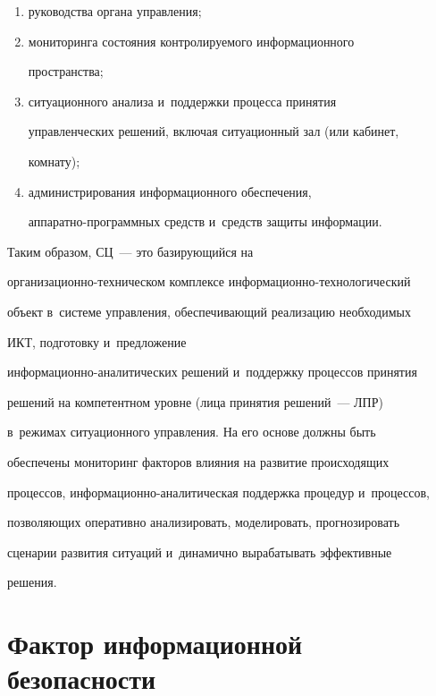     \begin{enumerate}[(1)]

    \item руководства органа управления;

    \item мониторинга состояния контролируемого информационного 

пространства;

    \item ситуационного анализа и~поддержки процесса принятия 

управленческих решений, включая ситуационный зал (или кабинет, 

комнату);

    \item администрирования информационного обеспечения,  

ап\-па\-рат\-но-про\-грам\-мных средств и~средств защиты информации. 

    \end{enumerate}

    

    Таким образом, СЦ~--- это базирующийся на  

организационно-техническом комплексе ин\-фор\-ма\-ци\-он\-но-тех\-но\-ло\-ги\-че\-ский 

объект в~сис\-те\-ме управ\-ле\-ния, обеспечивающий реализацию необходимых 

ИКТ, подготовку и~предложение 

ин\-фор\-ма\-ци\-он\-но-ана\-ли\-ти\-че\-ских решений и~поддержку процессов принятия 

решений на компетентном уровне (лица принятия решений~--- ЛПР) 

в~режимах ситуационного управления. На его основе должны быть 

обеспечены мониторинг факторов влияния на развитие происходящих 

процессов, ин\-фор\-ма\-ци\-он\-но-ана\-ли\-ти\-че\-ская поддержка процедур и~процессов, 

позволяющих оперативно анализировать, моделировать, прогнозировать 

сценарии развития ситуаций и~динамично вырабатывать эффективные 

решения.



    \vspace*{-4pt}

    

    \section{Фактор информационной безопасности}

